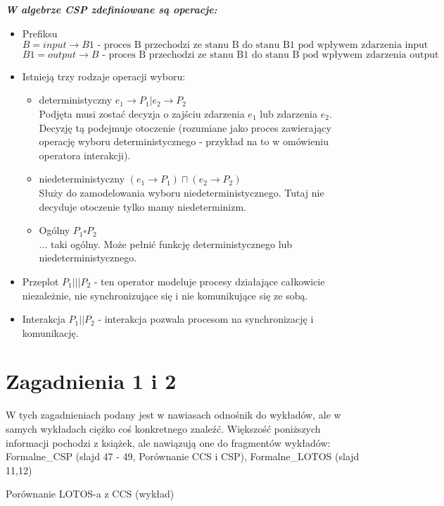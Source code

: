 \documentclass[a4paper,15pt]{article}
\newcommand{\issue}[2]{
    \begin{tcolorbox}[colback=issueColor!5!white,colframe=issueColor,title={Zagadnienie #1}]
        #2
    \end{tcolorbox}
}
\begin{document}
\textbf{\textit{W algebrze CSP zdefiniowane są operacje:}}
\begin{itemize}
\item Prefiksu \\
$ B = input \xrightarrow{} B1 \text{ - proces B przechodzi ze stanu B do stanu B1 pod wpływem zdarzenia input} $ \\
$ B1 = output \xrightarrow{} B \text{ - proces B przechodzi ze stanu B1 do stanu B pod wpływem zdarzenia output} $
\item Istnieją trzy rodzaje operacji wyboru:
\begin{itemize}
\item deterministyczny $e_1 \xrightarrow{} P_1 | e_2 \xrightarrow{} P_2$ \\
Podjęta musi zostać decyzja o zajściu zdarzenia $e_1$ lub zdarzenia $e_2$. Decyzję tą podejmuje otoczenie (rozumiane jako proces zawierający operację wyboru deterministycznego - przykład na to w omówieniu operatora interakcji).
\item niedeterministyczny $(e_1 \xrightarrow{} P_1 ) \sqcap (e_2 \xrightarrow{} P_2)$ \\
Służy do zamodelowania wyboru niedeterministycznego. Tutaj nie decyduje otoczenie tylko mamy niedeterminizm.
\item Ogólny $P_1 \square P_2$ \\
... taki ogólny. Może pełnić funkcję deterministycznego lub niedeterministycznego. 
\end{itemize}
\item Przeplot $P_1 ||| P_2$ - ten operator modeluje procesy działające całkowicie niezależnie, nie synchronizujące się i nie komunikujące się ze sobą. 
\item Interakcja $P_1 || P_2$ - interakcja pozwala procesom na synchronizację i komunikację.
\end{itemize}



\newpage
\section{Zagadnienia 1 i 2}

W tych zagadnieniach podany jest w nawiasach odnośnik do wykładów, ale w samych wykładach ciężko coś konkretnego znaleźć. Większość poniższych informacji pochodzi z książek, ale nawiązują one do fragmentów wykładów: Formalne\_CSP (slajd 47 - 49, Porównanie CCS i CSP), Formalne\_LOTOS (slajd 11,12) 

\issue{1}{
Porównanie LOTOS-a z CCS (wykład)
}
\end{document}
